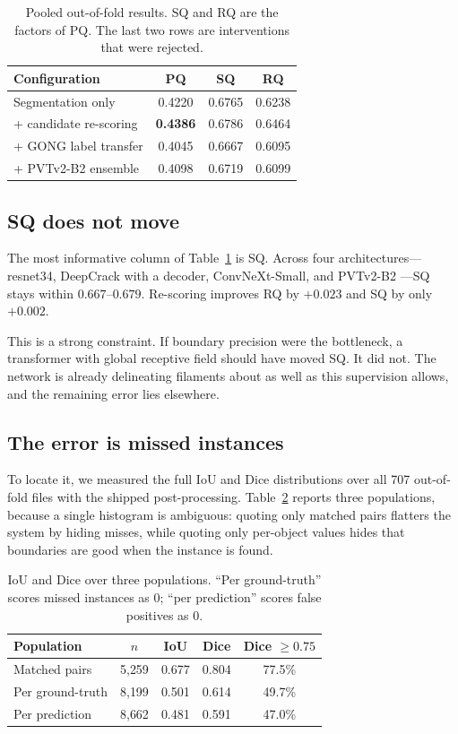 \documentclass[sigconf]{acmart}
\begin{document}
\begin{table}[t]
\centering
\caption{Pooled out-of-fold results. SQ and RQ are the factors of PQ. The last two rows are interventions that were rejected.}
\label{tab:results}
\small
\begin{tabular}{@{}lccc@{}}
\toprule
Configuration & PQ & SQ & RQ \\
\midrule
Segmentation only        & 0.4220 & 0.6765 & 0.6238 \\
+ candidate re-scoring   & \textbf{0.4386} & 0.6786 & 0.6464 \\
\midrule
+ GONG label transfer    & 0.4045 & 0.6667 & 0.6095 \\
+ PVTv2-B2 ensemble      & 0.4098 & 0.6719 & 0.6099 \\
\bottomrule
\end{tabular}
\end{table}

\subsection{SQ does not move}
    The most informative column of Table~\ref{tab:results} is SQ. Across four architectures---resnet34, DeepCrack with a decoder, ConvNeXt-Small, and PVTv2-B2 \cite{pvt}---SQ stays within $0.667$--$0.679$. Re-scoring improves RQ by $+0.023$ and SQ by only $+0.002$.

    This is a strong constraint. If boundary precision were the bottleneck, a transformer with global receptive field should have moved SQ. It did not. The network is already delineating filaments about as well as this supervision allows, and the remaining error lies elsewhere.

\subsection{The error is missed instances}
    To locate it, we measured the full IoU and Dice distributions over all 707 out-of-fold files with the shipped post-processing. Table~\ref{tab:dist} reports three populations, because a single histogram is ambiguous: quoting only matched pairs flatters the system by hiding misses, while quoting only per-object values hides that boundaries are good when the instance is found.

\begin{table}[t]
\centering
\caption{IoU and Dice over three populations. ``Per ground-truth'' scores missed instances as 0; ``per prediction'' scores false positives as 0.}
\label{tab:dist}
\small
\begin{tabular}{@{}lcccc@{}}
\toprule
Population & $n$ & IoU & Dice & Dice $\geq 0.75$ \\
\midrule
Matched pairs      & 5{,}259 & 0.677 & 0.804 & 77.5\% \\
Per ground-truth   & 8{,}199 & 0.501 & 0.614 & 49.7\% \\
Per prediction     & 8{,}662 & 0.481 & 0.591 & 47.0\% \\
\bottomrule
\end{tabular}
\end{table}
\end{document}
